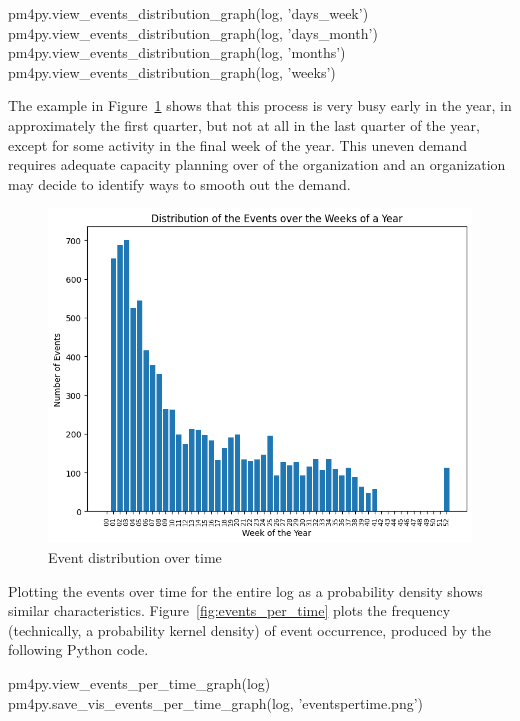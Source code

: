 \begin{samepage}
\begin{pythoncode}
pm4py.view_events_distribution_graph(log, 'days_week')
pm4py.view_events_distribution_graph(log, 'days_month')
pm4py.view_events_distribution_graph(log, 'months')
pm4py.view_events_distribution_graph(log, 'weeks')
\end{pythoncode}
\end{samepage}

The example in Figure~\ref{fig:event_distribution} shows that this process is very busy early in the year, in approximately the first quarter, but not at all in the last quarter of the year, except for some activity in the final week of the year. This uneven demand requires adequate capacity planning over of the organization and an organization may decide to identify ways to smooth out the demand. 

\begin{figure}
\centering
\includegraphics[width=.7\textwidth]{eventsdistribution.png}
\caption{Event distribution over time}
\label{fig:event_distribution}
\end{figure}

Plotting the events over time for the entire log as a probability density shows similar characteristics. Figure~\ref{fig:events_per_time} plots the frequency (technically, a probability kernel density) of event occurrence, produced by the following Python code.

\begin{samepage}
\begin{pythoncode}
pm4py.view_events_per_time_graph(log)
pm4py.save_vis_events_per_time_graph(log, 'eventspertime.png')
\end{pythoncode}
\end{samepage}

